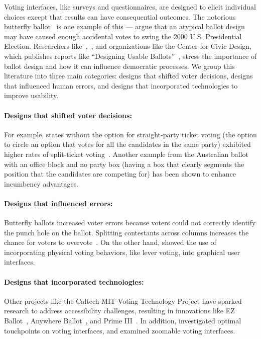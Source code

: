 Voting interfaces, like surveys and questionnaires, are designed to elicit individual choices except that results can have consequential outcomes. The notorious butterfly ballot~\cite{wandButterflyDidIt2001} is one example of this --- \textcite{wandButterflyDidIt2001} argue that an atypical ballot design may have caused enough accidental votes to swing the 2000 U.S. Presidential Election. Researchers like~\textcite{engstrom2020politics},~\textcite{chisnellDemocracyDesignProblem2016}, and organizations like the Center for Civic Design, which publishes reports like ``Designing Usable Ballots''~\cite{DesigningUsableBallots2015}, stress the importance of ballot design and how it can influence democratic processes. We group this literature into three main categories: designs that shifted voter decisions, designs that influenced human errors, and designs that incorporated technologies to improve usability.

\paragraph{Designs that shifted voter decisions: } For example, states without the option for straight-party ticket voting (the option to circle an option that votes for all the candidates in the same party) exhibited higher rates of split-ticket voting~\cite{engstrom2020politics}. Another example from the Australian ballot with an office block and no party box (having a box that clearly segments the position that the candidates are competing for) has been shown to enhance incumbency advantages.
\paragraph{Designs that influenced errors: } Butterfly ballots increased voter errors because voters could not correctly identify the punch hole on the ballot. Splitting contestants across columns increases the chance for voters to overvote~\cite{quesenberyOpinionGoodDesign2020}. On the other hand, \textcite{everettElectronicVotingMachines2008} showed the use of incorporating physical voting behaviors, like lever voting, into graphical user interfaces.
\paragraph{Designs that incorporated technologies: } Other projects like the Caltech-MIT Voting Technology Project have sparked research to address accessibility challenges, resulting in innovations like EZ Ballot~\cite{leeUniversalDesignBallot2016}, Anywhere Ballot~\cite{summers2014making}, and Prime III~\cite{dawkinsPrimeIIIInnovative2009}. In addition, \textcite{gilbertAnomalyDetectionElectronic2013} investigated optimal touchpoints on voting interfaces, and \textcite{conradElectronicVotingEliminates2009} examined zoomable voting interfaces.

